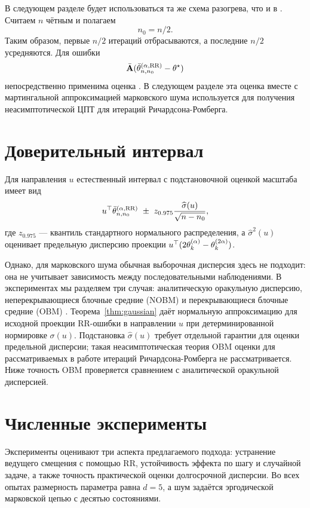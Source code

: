 \documentclass[blind]{psta}
\begin{document}
В следующем разделе будет использоваться та же схема разогрева, что и в
\cite[Теорема~2]{Levin2026}. Считаем $n$ чётным и полагаем
\begin{equation}\label{eq:half-burn-in}
 n_0=n/2.
\end{equation}
Таким образом, первые $n/2$ итераций отбрасываются, а последние $n/2$
усредняются. Для ошибки
\[
 \bar{\mathbf{A}}(\bar{\theta}_{n,n_0}^{(\alpha, \mathrm{RR})}-\theta^\star)
\]
непосредственно применима оценка \cite[Теорема~2]{Levin2026}.
В следующем разделе эта оценка вместе с мартингальной аппроксимацией
марковского шума используется для получения неасимптотической ЦПТ для итераций Ричардсона-Ромберга.



\section{Доверительный интервал}\label{sec:ci}

Для направления $u$ естественный интервал с подстановочной оценкой масштаба имеет вид
\begin{equation}\label{eq:ci}
 u^\top\bar{\theta}_{n,n_0}^{(\alpha,\mathrm{RR})}
 \ \pm\ z_{0.975}\frac{\widehat\sigma(u)}{\sqrt{n-n_0}},
\end{equation}
где $z_{0.975}$ --- квантиль стандартного нормального распределения, а
$\widehat\sigma^2(u)$ оценивает предельную дисперсию проекции
$u^\top(2\theta_k^{(\alpha)}-\theta_k^{(2\alpha)})$.

Однако, для марковского шума обычная выборочная дисперсия здесь не подходит: она не учитывает зависимость между последовательными наблюдениями. В экспериментах мы разделяем три случая:
аналитическую оракульную дисперсию, неперекрывающиеся блочные средние (NOBM) и
перекрывающиеся блочные средние (OBM)
\cite{FlegalJones2010,LiuVatsFlegal2022}. Теорема~\ref{thm:gaussian} даёт нормальную аппроксимацию для исходной
проекции RR-ошибки в направлении $u$ при детерминированной нормировке
$\sigma(u)$. Подстановка
$\widehat\sigma(u)$ требует отдельной гарантии для оценки предельной
дисперсии; такая неасимптотическая теория OBM оценки для рассматриваемых в работе итераций Ричардсона-Ромберга не рассматривается.
Ниже точность OBM проверяется сравнением с аналитической оракульной дисперсией.

\section{Численные эксперименты}\label{sec:experiments}

Эксперименты оценивают три аспекта предлагаемого подхода: устранение ведущего
смещения с помощью RR, устойчивость эффекта по шагу и случайной задаче, а
также точность практической оценки долгосрочной дисперсии. Во всех
опытах размерность параметра равна $d=5$, а шум задаётся эргодической
марковской цепью с десятью состояниями.
\end{document}
